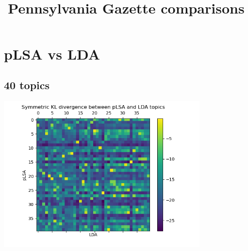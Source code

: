 \documentclass[12pt, letterpaper]{article}
\title{Pennsylvania Gazette comparisons}
\author{}
\date{}
\begin{document}
\maketitle

\section{pLSA vs LDA}

\subsection{40 topics}

\begin{center}
	\includegraphics[width = 0.8\textwidth]{Pennsylvania_Gazette_plsa_vs_lda_40_topics_similarity_plot}
\end{center}


\end{document}
